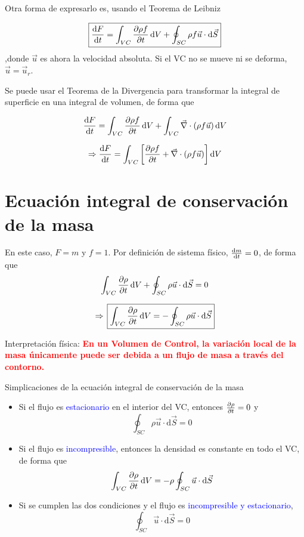 	
	Otra forma de expresarlo es, usando el Teorema de Leibniz \cite[Sección 3.6]{Kundu2012}
	
\begin{equation}
		\boxed{\frac{\textrm{d} F}{\textrm{d} t}=\int_{VC}\frac{\partial \rho f}{\partial t}\,\text{d}V+\oint_{SC}\rho f\vec{u}\cdot\text{d}\vec{S}}
\end{equation}
	,donde $\vec{u}$ es ahora la velocidad absoluta. Si el VC no se mueve
	ni se deforma, $\vec{u}=\vec{u}_{r}$. 
	
	Se puede usar el Teorema de la Divergencia para transformar la integral
	de superficie en una integral de volumen, de forma que
	
	\[
	\frac{\textrm{d} F}{\textrm{d} t}=\int_{VC}\frac{\partial \rho f}{\partial t}\,\text{d}V+\int_{VC}\vec{\nabla}\cdot\left(\rho f\vec{u}\right)\text{d}V
	\]
	
	\[
	\Rightarrow\frac{\textrm{d} F}{\textrm{d} t}=\int_{VC}\left[\frac{\partial \rho f}{\partial t}+\vec{\nabla}\cdot\left(\rho f\vec{u}\right)\right]\text{d}V
	\]
	
\section{Ecuación integral de conservación de la masa}

	
	En este caso, $F=m$ y $f=1$. Por definición de sistema físico, $\frac{\textrm{d} m}{\textrm{d} t}=0$,
	de forma que 
	\[
	\int_{VC}\frac{\partial \rho}{\partial t}\,\text{d}V+\oint_{SC}\rho\vec{u}\cdot\text{d}\vec{S}=0
	\]
	
	\[
	\Rightarrow\,\boxed{\int_{VC}\frac{\partial \rho}{\partial t}\,\text{d} V=-\oint_{SC}\rho\vec{u}\cdot\text{d}\vec{S}}
	\]
	
	Interpretación física: \textbf{\textcolor{red}{En un Volumen de Control,
			la variación local de la masa únicamente puede ser debida a un flujo
			de masa a través del contorno.}} 

	
	Simplicaciones de la ecuación integral de conservación de la masa
	\begin{itemize}
		\item Si el flujo es \textcolor{blue}{estacionario} en el interior del VC,
		entonces $\frac{\partial \rho}{\partial t}=0$ y
		\[
		\oint_{SC}\rho\vec{u}\cdot\text{d}\vec{S}=0
		\]
		
		\item Si el flujo es \textcolor{blue}{incompresible}, entonces la densidad
		es constante en todo el VC, de forma que
		\[
		\int_{VC}\frac{\partial \rho}{\partial t}\,\text{d}V=-\rho\oint_{SC}\vec{u}\cdot\text{d}\vec{S}
		\]
		
		\item Si se cumplen las dos condiciones y el flujo es \textcolor{blue}{incompresible
			y estacionario},
		\[
		\oint_{SC}\vec{u}\cdot\text{d}\vec{S}=0
		\]
	\end{itemize}


